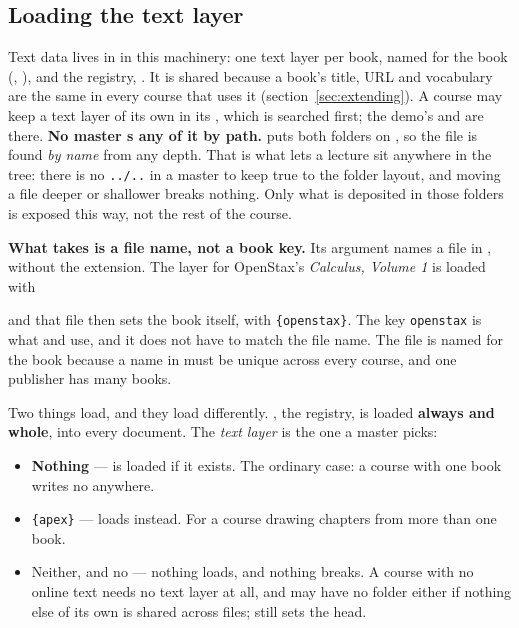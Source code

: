 \subsection*{Loading the text layer}

Text data lives in  in this machinery: one text layer per book, named for the book (, ), and the registry, .
It is shared because a book's title, URL and vocabulary are the same in every course that uses it (section~\ref{sec:extending}).
A course may keep a text layer of its own in its , which is searched first; the demo's  and  are there.
\textbf{No master s any of it by path.}  puts both folders on
, so the file is found \emph{by name} from any depth. That
is what lets a lecture sit anywhere in the tree: there is no \texttt{../..}
in a master to keep true to the folder layout, and moving a file deeper or
shallower breaks nothing. Only what is deposited in those folders is exposed
this way, not the rest of the course.

\textbf{What  takes is a file name, not a book key.}
Its argument names a file in , without the extension.
The layer for OpenStax's \emph{Calculus, Volume 1} is loaded with

\begin{manexsource}
\end{manexsource}

\noindent and that file then sets the book itself, with \texttt{\{openstax\}}.
The key \texttt{openstax} is what  and  use, and it does not have to match the file name.
The file is named for the book because a name in  must be unique across every course, and one publisher has many books.

Two things load, and they load differently.
, the registry, is loaded \textbf{always and whole}, into
every document. The \emph{text layer} is the one a master picks:

\begin{itemize}
  \item \textbf{Nothing} ---  is loaded if it exists.
    The ordinary case: a course with one book writes no 
    anywhere.
  \item {}\texttt{\{apex\}} --- loads  instead.
    For a course drawing chapters from more than one book.
  \item Neither, and no  --- nothing loads, and nothing
    breaks. A course with no online text needs no text layer at all, and
    may have no  folder either if nothing
    else of its own is shared across files;  still sets
    the head.
\end{itemize}

